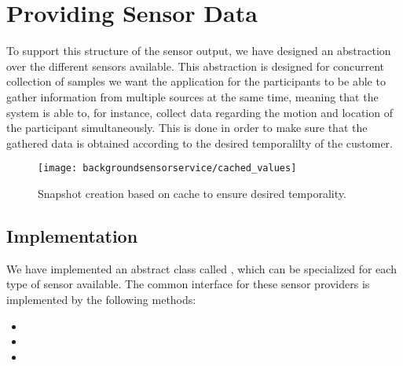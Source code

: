 \section{Providing Sensor Data}
\label{sec:providing_sensor_data}

To support this structure of the sensor output, we have designed an abstraction over the different sensors available. This abstraction is designed for concurrent collection of samples we want the application for the participants to be able to gather information from multiple sources at the same time, meaning that the system is able to, for instance, collect data regarding the motion and location of the participant simultaneously. This is done in order to make sure that the gathered data is obtained according to the desired temporalilty of the customer.

\begin{figure}[!htbp]
    \centering
    \texttt{[image: backgroundsensorservice/cached\_values]}
    \caption{Snapshot creation based on cache to ensure desired temporality.}
    \label{fig:cached_values}
\end{figure}
\FloatBarrier

\subsection{Implementation}
We have implemented an abstract class called , which can be specialized for each type of sensor available. The common interface for these sensor providers is implemented by the following methods:

\begin{itemize}
	\item {}
	\item {}
	\item {}
\end{itemize}

